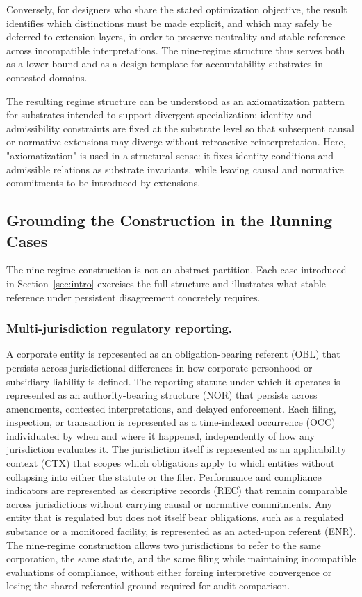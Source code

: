 Conversely, for designers who share the stated optimization objective, the
result identifies which distinctions must be made explicit,
and which may safely be deferred to extension layers,
in order to preserve neutrality and stable reference
across incompatible interpretations.
The nine-regime structure thus serves both as a lower bound and
as a design template for accountability substrates in contested domains.

The resulting regime structure can be understood
as an axiomatization pattern for substrates
intended to support divergent specialization:
identity and admissibility constraints
are fixed at the substrate level so that
subsequent causal or normative extensions
may diverge without retroactive reinterpretation.
Here, "axiomatization" is used in a structural sense:
it fixes identity conditions and admissible relations
as substrate invariants, while leaving
causal and normative commitments to be introduced by extensions.

\subsection{Grounding the Construction in the Running Cases}

The nine-regime construction is not an abstract partition.
Each case introduced in Section~\ref{sec:intro} exercises the full structure and
illustrates what stable reference under persistent disagreement concretely requires.

\subsubsection{Multi-jurisdiction regulatory reporting.}
A corporate entity is represented as an obligation-bearing referent (OBL)
that persists across jurisdictional differences in how corporate
personhood or subsidiary liability is defined.
The reporting statute under which it operates is represented as an
authority-bearing structure (NOR) that persists across amendments,
contested interpretations, and delayed enforcement.
Each filing, inspection, or transaction is represented as a
time-indexed occurrence (OCC) individuated by when and where it happened,
independently of how any jurisdiction evaluates it.
The jurisdiction itself is represented as an applicability context (CTX)
that scopes which obligations apply to which entities without collapsing
into either the statute or the filer.
Performance and compliance indicators are represented as descriptive
records (REC) that remain comparable across jurisdictions without
carrying causal or normative commitments.
Any entity that is regulated but does not itself bear obligations,
such as a regulated substance or a monitored facility, is
represented as an acted-upon referent (ENR).
The nine-regime construction allows two jurisdictions to refer to the
same corporation, the same statute, and the same filing while
maintaining incompatible evaluations of compliance,
without either forcing interpretive convergence or losing
the shared referential ground required for audit comparison.


